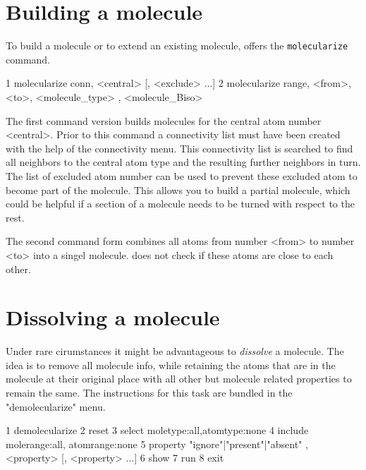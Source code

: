 
\section{Building   a molecule \label{mod-molec}}

To build a molecule or to extend an existing molecule, \discus
offers the {\tt molecularize} command. 
\begin{MacVerbatim}
 1 molecularize conn, <central> [, <exclude> ...]
 2 molecularize range, <from>, <to>, <molecule_type> , <molecule_Biso>
\end{MacVerbatim}

The first command version builds molecules for the central atom
number  <central>. Prior to this command a connectivity list must have been
created with the help of the connectivity menu. This connectivity list is
searched to find all neighbors to the central atom type and the resulting
further neighbors in turn. The list of excluded atom number can be used 
to prevent these excluded atom to become part of the molecule. 
This allows you to build a partial molecule, which could be helpful
if a section of a molecule needs to be turned with respect to the rest.

The second command form combines all atoms from number <from> to number <to>
into a singel molecule. \discus does not check if these atoms are close to 
each other.


\section{Dissolving a molecule \label{mod-demole}}

Under rare cirumstances it might be advantageous to {\it dissolve} a molecule.
The idea is to remove all molecule info, while retaining the atoms that are in
the molecule at their original place with all other but molecule related 
properties to remain the same. The instructions for this task are bundled in
the "demolecularize" menu.

\begin{MacVerbatim}
 1 demolecularize
 2   reset
 3   select moletype:all,atomtype:none
 4   include molerange:all, atomrange:none
 5   property {"ignore"|"present"|"absent"} , <property> [, <property> ...]
 6   show
 7   run
 8 exit
\end{MacVerbatim}

